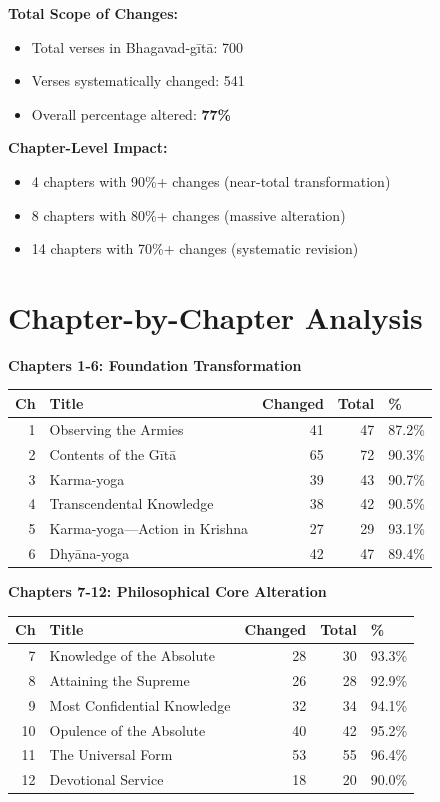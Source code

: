 \documentclass[11pt,twoside]{book}
\begin{document}
\textbf{\textbf{Total Scope of Changes:}}
\begin{itemize}
\item Total verses in Bhagavad-gītā: 700
\item Verses systematically changed: 541
\item Overall percentage altered: \textbf{\textbf{77\%}}
\end{itemize}

\textbf{\textbf{Chapter-Level Impact:}}
\begin{itemize}
\item 4 chapters with 90\%+ changes (near-total transformation)
\item 8 chapters with 80\%+ changes (massive alteration)
\item 14 chapters with 70\%+ changes (systematic revision)
\end{itemize}
\section*{Chapter-by-Chapter Analysis}
\label{sec:orgf34cafe}

\textbf{\textbf{Chapters 1-6: Foundation Transformation}}

\small
\begin{center}
\begin{tabular}{rlrrl}
Ch & Title & Changed & Total & \%\\
\hline
1 & Observing the Armies & 41 & 47 & 87.2\%\\
2 & Contents of the Gītā & 65 & 72 & 90.3\%\\
3 & Karma-yoga & 39 & 43 & 90.7\%\\
4 & Transcendental Knowledge & 38 & 42 & 90.5\%\\
5 & Karma-yoga—Action in Krishna & 27 & 29 & 93.1\%\\
6 & Dhyāna-yoga & 42 & 47 & 89.4\%\\
\end{tabular}
\end{center}

\textbf{\textbf{Chapters 7-12: Philosophical Core Alteration}}

\small
\begin{center}
\begin{tabular}{rlrrl}
Ch & Title & Changed & Total & \%\\
\hline
7 & Knowledge of the Absolute & 28 & 30 & 93.3\%\\
8 & Attaining the Supreme & 26 & 28 & 92.9\%\\
9 & Most Confidential Knowledge & 32 & 34 & 94.1\%\\
10 & Opulence of the Absolute & 40 & 42 & 95.2\%\\
11 & The Universal Form & 53 & 55 & 96.4\%\\
12 & Devotional Service & 18 & 20 & 90.0\%\\
\end{tabular}
\end{center}
\end{document}
